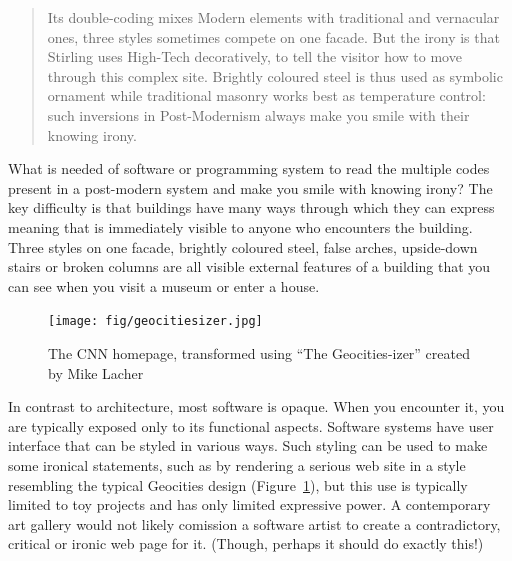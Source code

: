 \begin{quote}
Its double-coding mixes Modern elements with traditional and vernacular ones, three styles
sometimes compete on one facade. But the irony is that Stirling uses High-Tech decoratively,
to tell the visitor how to move through this complex site. Brightly coloured steel is thus used
as symbolic ornament while traditional masonry works best as temperature control:
such inversions in Post-Modernism always make you smile with their knowing irony.
\end{quote}

What is needed of software or programming system to read the multiple codes present in a post-modern
system and make you smile with knowing irony? The key difficulty is that buildings have many
ways through which they can express meaning that is immediately visible to anyone who encounters
the building. Three styles on one facade, brightly coloured steel, false arches, upside-down
stairs or broken columns are all visible external features of a building that you can see
when you visit a museum or enter a house.

\begin{figure}
\centering
\vspace{-1em}
\texttt{[image: fig/geocitiesizer.jpg]}
\caption{The CNN homepage, transformed using ``The Geocities-izer'' created by Mike Lacher}
\label{fig:geocitiesizer}
\end{figure}

In contrast to architecture, most software is opaque. When you encounter it, you are typically
exposed only to its functional aspects. Software systems have user interface that can be styled
in various ways. Such styling can be used to make some ironical statements, such as by rendering
a serious web site in a style resembling the typical Geocities design (Figure~\ref{fig:geocitiesizer}),
but this use is typically limited to toy projects and has only limited expressive power.
A contemporary art gallery would not likely comission a software artist to create a contradictory,
critical or ironic web page for it. (Though, perhaps it should do exactly this!)

